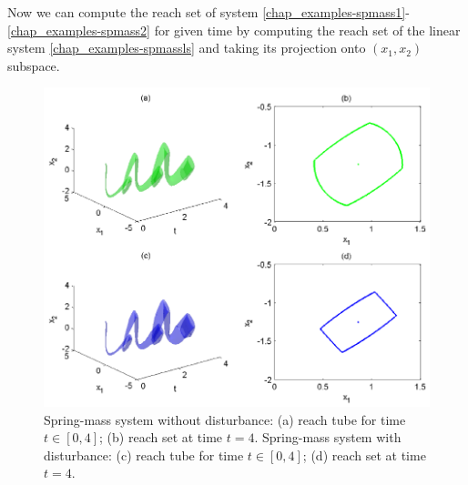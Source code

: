 \documentclass[letterpaper,10pt,english]{sphinxmanual}
\begin{document}
Now we can compute the reach set of system \eqref{chap_examples-spmass1}-\eqref{chap_examples-spmass2} for
given time by computing the reach set of the linear system \eqref{chap_examples-spmassls}
and taking its projection onto $(x_1, x_2)$ subspace.
\begin{figure}[htbp]
\centering
\capstart

\includegraphics{reachmech.png}
\caption{Spring-mass system without disturbance:
(a) reach tube for time $t\in[0,4]$; (b) reach set at time $t=4$.
Spring-mass system with disturbance:
(c) reach tube for time $t\in[0,4]$; (d) reach set at time $t=4$.}\label{chap_examples:mechreachfig}\end{figure}
\end{document}
